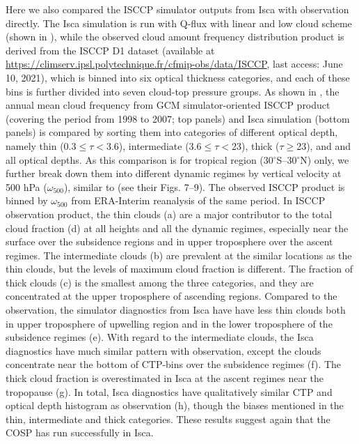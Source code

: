 Here we also compared the ISCCP simulator outputs from Isca with observation directly. The Isca simulation is run with Q-flux with linear and low cloud scheme (shown in ), while the observed cloud amount frequency distribution product is derived from the ISCCP D1 dataset \citep{Rossow1999advances} (available at \url{https://climserv.ipsl.polytechnique.fr/cfmip-obs/data/ISCCP}, last access: June 10, 2021), which is binned into six optical thickness categories, and each of these bins is further divided into seven cloud-top pressure groups. As shown in , 
the annual mean cloud frequency from  GCM simulator-oriented ISCCP product (covering the period from 1998 to 2007; top panels) and Isca simulation (bottom panels) is compared by sorting them into categories of different optical depth, namely thin (0.3$\le\tau<$3.6), intermediate (3.6$\le\tau<$23), thick ($\tau\ge$23), and and all optical depths. As this comparison is for tropical region (30$^\circ$S--30$^\circ$N) only, we further break down them into different dynamic regimes by vertical velocity at 500 hPa ($\omega_{500}$), similar to \cite{Wyant2006comparison} (see their Figs. 7--9). The observed ISCCP product is binned by $\omega_{500}$ from ERA-Interim reanalysis of the same period. In ISCCP observation product, the thin clouds (a) are a major contributor to the total cloud fraction (d) at all heights and all the dynamic regimes, especially near the surface over the subsidence regions and in upper troposphere over the ascent regimes. The intermediate clouds (b) are prevalent at the similar locations as the thin clouds, but the levels of maximum cloud fraction is different. The fraction of thick clouds (c) is the smallest among the three categories, and they are concentrated at the upper troposphere of ascending regions. Compared to the observation, the simulator diagnostics from Isca have have less thin clouds both in upper troposphere of upwelling region and in the lower troposphere of the subsidence regimes (e). With regard to the intermediate clouds, the Isca diagnostics have much similar pattern with observation, except the clouds concentrate near the bottom of CTP-bins over the subsidence regimes (f). The thick cloud fraction is overestimated in Isca at the ascent regimes near the tropopause (g). In total, Isca diagnostics have qualitatively similar CTP and optical depth histogram as observation (h), though the biases mentioned in the thin, intermediate and thick categories. These results suggest again that the COSP has run successfully in Isca.


